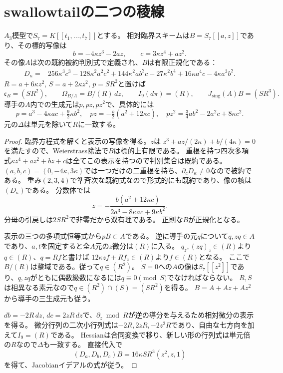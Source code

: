 \section{swallowtailの二つの稜線}
\begin{theorem}\label{mh:swallowtail}
$A_3$模型で$S_7=K[[t_1,\ldots,t_7]]$とする。
相対臨界スキームは$B=S_7[[a,z]]$であり、その標的写像は
\[
 b=-4\kappa z^3-2az,\qquad c=3\kappa z^4+az^2.
\]
その像$A$は次の既約被約判別式で定義され、$B$は有限正規化である：
\begin{align*}
 D_\kappa={}&256\kappa^3c^3-128\kappa^2a^2c^2+144\kappa^2ab^2c
 -27\kappa^2b^4+16\kappa a^4c-4\kappa a^3b^2.
\end{align*}
$R=a+6\kappa z^2$, $S=a+2\kappa z^2$, $p=SR^2$と置けば
\[
 \mathfrak c_B=(SR^2),\qquad \Omega_{B/A}=B/(R)\,dz,\qquad
 I_9(d\pi)=(R),\qquad J_{\mathrm{sing}}(A)B=(SR^3).
\]
導手の$A$内での生成元は$p,pz,pz^2$で、具体的には
\[
 p=a^3-4\kappa ac+\tfrac92\kappa b^2,\quad
 pz=-\tfrac b2(a^2+12\kappa c),\quad
 pz^2=\tfrac34ab^2-2a^2c+8\kappa c^2.
\]
元の$\Delta$は単元を除いて$R$に一致する。
\end{theorem}
\begin{proof}
臨界方程式を解くと表示の写像を得る。$z$は
$z^3+az/(2\kappa)+b/(4\kappa)=0$を満たすので、Weierstrass除法で$B$は標的上有限である。
重根を持つ四次多項式$\kappa z^4+az^2+bz+c$は全てこの表示を持つので判別集合は既約である。
$(a,b,c)=(0,-4\kappa,3\kappa)$では一つだけの二重根を持ち、$\partial_cD_\kappa\ne0$なので被約である。
重み$(2,3,4)$で準斉次な既約式なので形式的にも既約であり、像の核は$(D_\kappa)$である。
分数体では
\[
 z=-\frac{b(a^2+12\kappa c)}{2a^3-8\kappa ac+9\kappa b^2}.
\]
分母の引戻しは$2SR^2$で非零だから双有理である。
正則な$B$が正規化となる。

表示の三つの多項式恒等式から$pB\subset A$である。
逆に導手の元$q$について$q,zq\in A$であり、$a,t$を固定すると全$A$元の$z$微分は$(R)$に入る。
$q_z,(zq)_z\in(R)$より$q\in(R)$、$q=Rf$と書けば
$12\kappa zf+Rf_z\in(R)$より$f\in(R)$となる。
ここで$B/(R)$は整域である。従って$q\in(R^2)$。
$S=0$への$A$の像は$S_7[[z^2]]$であり、$q,zq$がともに偶数級数になるには$q\equiv0\pmod S$でなければならない。
$R,S$は相異なる素元なので$q\in(R^2)\cap(S)=(SR^2)$を得る。
$B=A+Az+Az^2$から導手の三生成元も従う。

$db=-2R\,dz$, $dc=2zR\,dz$で、$\partial_z\bmod R$が逆の導分を与えるため相対微分の表示を得る。
微分行列の二次小行列式は$-2R,2zR,-2z^2R$であり、自由な七方向を加えて$I_9=(R)$である。
Hessianは合同変換で移り、新しい形の行列式は単元倍の$R$なので$\Delta$も一致する。
直接代入で
\[
 (D_a,D_b,D_c)B=16\kappa SR^3(z^2,z,1)
\]
を得て、Jacobianイデアルの式が従う。
\end{proof}

